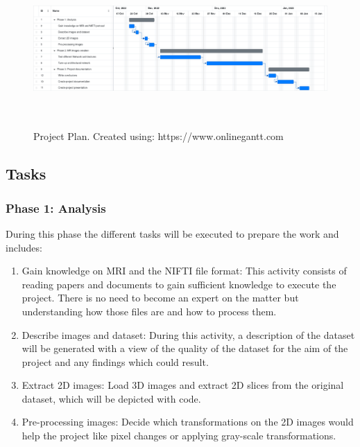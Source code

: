 \begin{figure}[ht]
    \hspace*{-1.2in}
    \centering
    \includegraphics[width = 20cm, height = 6cm]{images/project-plan.png}
    \caption[Project Plan]{Project Plan. Created using: https://www.onlinegantt.com}
    \label{fig:project-plan}
\end{figure}

\newpage
\subsection{Tasks}
\subsubsection*{Phase 1: Analysis}

During this phase the different tasks will be executed to prepare the work and includes:
\begin{enumerate}
    \item Gain knowledge on MRI and the NIFTI file format: This activity consists of reading papers and documents to gain sufficient knowledge to execute the project. There is no need to become an expert on the matter but understanding how those files are and how to process them.
    \item Describe images and dataset: During this activity, a description of the dataset will be generated with a view of the quality of the dataset for the aim of the project and any findings which could result.
    \item Extract 2D images: Load 3D images and extract 2D slices from the original dataset, which will be depicted with code.
    \item Pre-processing images: Decide which transformations on the 2D images would help the project like pixel changes or applying gray-scale transformations.
\end{enumerate}

